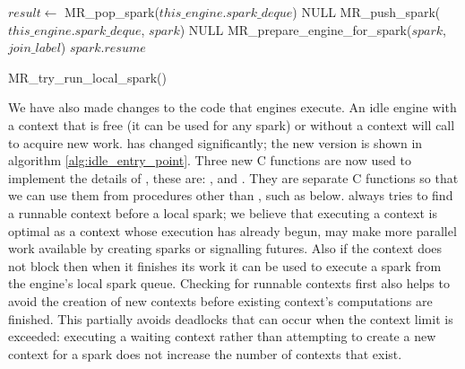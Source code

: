 \begin{algorithm}[tbp]
\begin{algorithmic}
    \State $result \gets$ MR\_pop\_spark($this\_engine.spark\_deque$)
        \State \Return NULL
    \EndIf
        \State MR\_push\_spark($this\_engine.spark\_deque$, $spark$)
        \State \Return NULL
    \EndIf
    \State MR\_prepare\_engine\_for\_spark($spark$, $join\_label$)
    \State \Return $spark.resume$
\EndProcedure
\end{algorithmic}
\caption{MR\_try\_run\_local\_spark()}
\label{alg:try_run_local_spark}
\end{algorithm}

We have also made changes to the code that \idle engines execute.
An idle engine with a context that is free (it can be used for any spark) or
without a context will call \idle to acquire new work.
\idle has changed significantly;
the new version is shown in algorithm \ref{alg:idle_entry_point}.
Three new C functions are now used to implement the details of \idle, these
are:
\tryruncontext, \tryrunlocalspark and \trystealspark.
They are separate C functions so that we can use them from procedures other
than \idle, such as \joinandcontinue below.
\idle always tries to find a runnable context before a local spark;
we believe that executing a context is optimal
as a context whose execution has already begun,
may make more parallel work available by creating sparks or signalling
futures.
Also if the context does not block then when it finishes its work it can be
used to execute a spark from the engine's local spark queue.
Checking for runnable contexts first also helps to avoid the creation of new
contexts before existing context's computations are finished.
This partially avoids deadlocks that can occur when the context limit is
exceeded:
executing a waiting context rather than attempting to create a new context
for a spark does not increase the number of contexts that exist.


